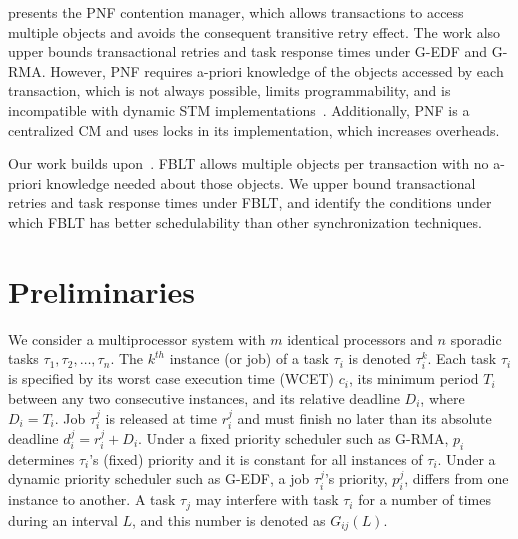 \documentclass[prodmode,acmtecs]{acmsmall}
\begin{document}
\cite{shambake_phd_proposal} presents the PNF contention manager, which allows transactions to access  multiple objects and avoids the consequent transitive retry effect. The work also upper bounds transactional retries and task response times under G-EDF and G-RMA. However, PNF requires a-priori knowledge of the objects accessed by each transaction, which is not always possible, limits programmability, and is incompatible with dynamic STM implementations~\cite{Herlihy:2003:STM:872035.872048}. Additionally, PNF is a centralized CM and uses locks in its implementation, which increases overheads. 

Our work builds upon~\cite{stmconcurrencycontrol:emsoft11,lcmdac2012,shambake_phd_proposal}. FBLT allows multiple objects per transaction with no a-priori knowledge needed about those objects. We upper bound transactional retries and task response times under FBLT, and identify the conditions under which FBLT has  better schedulability than other synchronization techniques.


\section{Preliminaries}
\label{sec:model}

We consider a multiprocessor system with $m$ identical processors and $n$ sporadic tasks $\tau_1, \tau_2,\ldots, \tau_n$. The $k^{th}$ instance (or job) of a task $\tau_i$ is denoted $\tau_i^k$. Each task $\tau_i$ is specified by its worst case execution time (WCET) $c_i$, its minimum period $T_i$ between any two consecutive instances, and its relative deadline $D_i$, where $D_i=T_i$. Job $\tau_i^j$ is released at time $r_i^j$ and must finish no later than its absolute deadline $d_i^j=r_i^j+D_i$. Under a fixed priority scheduler such as G-RMA, $p_i$ determines $\tau_i$'s (fixed) priority and it is constant for all instances of $\tau_i$. Under a dynamic priority scheduler such as G-EDF, a job $\tau_i^j$'s priority, $p_i^j$, differs from one instance to another. 
A task $\tau_j$ may interfere with task $\tau_i$ for a number of times during an interval $L$, and this number is denoted as $G_{ij}(L)$. 
\end{document}
